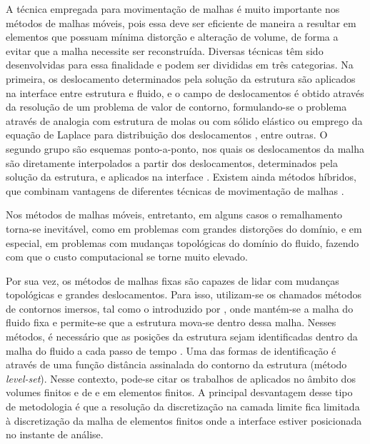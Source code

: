 A técnica empregada para movimentação de malhas é muito importante nos métodos de malhas móveis, pois essa deve ser eficiente de maneira a resultar em elementos que possuam mínima distorção e alteração de volume, de forma a evitar que a malha necessite ser reconstruída. Diversas técnicas têm sido desenvolvidas para essa finalidade e podem ser divididas em três categorias. Na primeira, os deslocamento determinados pela solução da estrutura são aplicados na interface entre estrutura e fluido, e o campo de deslocamentos é obtido através da resolução de um problema de valor de contorno, formulando-se o problema através de analogia com estrutura de molas \cite{BottassoDS:2005} ou com sólido elástico \cite{JohnsonT:1994,SteinTB:2004} ou emprego da equação de Laplace para distribuição dos deslocamentos \cite{KanchiM:2007}, entre outras. O segundo grupo são esquemas ponto-a-ponto, nos quais os deslocamentos da malha são diretamente interpolados a partir dos deslocamentos, determinados pela solução da estrutura, e aplicados na interface \cite{DoneaGH:1982,SanchesC:2014,TezduyarABJ:1993}. Existem ainda métodos híbridos, que combinam vantagens de diferentes técnicas de movimentação de malhas \cite{FernandesCS:2019,Lefrancois:2008}. 

Nos métodos de malhas móveis, entretanto, em alguns casos o remalhamento torna-se inevitável, como em problemas com grandes distorções do domínio, e em especial, em problemas com mudanças topológicas do domínio do fluido, fazendo com que o custo computacional se torne muito elevado.

Por sua vez, os métodos de malhas fixas são capazes de lidar com mudanças topológicas e grandes deslocamentos. Para isso, utilizam-se os chamados métodos de contornos imersos, tal como o introduzido por , onde mantém-se a malha do fluido fixa e permite-se que a estrutura mova-se dentro dessa malha. Nesses métodos, é necessário que as posições da estrutura sejam identificadas dentro da malha do fluido a cada passo de tempo \cite{MittalI:2005,WangRGF:2011}. Uma das formas de identificação é através de uma função distância assinalada do contorno da estrutura (método \textit{level-set}). Nesse contexto, pode-se citar os trabalhos de   aplicados no âmbito dos volumes finitos e de  e  em elementos finitos. A principal desvantagem desse tipo de metodologia é que a resolução da discretização na camada limite fica limitada à discretização da malha de elementos finitos onde a interface estiver posicionada no instante de análise.

